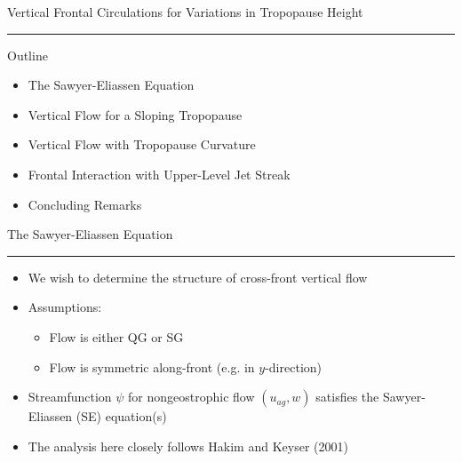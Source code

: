 \documentclass[landscape]{seminar}
\begin{document}
\begin{slide}

\begin{center}
{\color{darkblue} \large Vertical Frontal Circulations for Variations in Tropopause Height \\ \rule[0.15in]{\textwidth}{.03in}}
\end{center}

{\color{darkblue} \large Outline}
\begin{itemize}
\item The Sawyer-Eliassen Equation

\item Vertical Flow for a Sloping Tropopause

\item Vertical Flow with Tropopause Curvature

\item Frontal Interaction with Upper-Level Jet Streak

\item Concluding Remarks
\end{itemize}

\end{slide}
\begin{slide}

\begin{center}
{\color{darkblue} \large The Sawyer-Eliassen Equation \\ \rule[0.15in]{\textwidth}{.03in}}
\end{center}

\begin{itemize}
\item We wish to determine the structure of cross-front vertical flow

\item Assumptions:

\begin{itemize}
  \item Flow is either QG or SG
  \item Flow is symmetric along-front (e.g. in $y$-direction)
\end{itemize}

\item Streamfunction $\psi$ for nongeostrophic flow $(u_{ag},w)$ satisfies the Sawyer-Eliassen (SE) equation(s)

\item The analysis here closely follows Hakim and Keyser (2001)

\end{itemize}

\end{slide}
\end{document}
